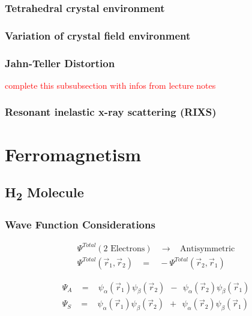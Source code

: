 \documentclass[10pt]{report}
\numberwithin{equation}{chapter}
\begin{document}
\subsubsection{Tetrahedral crystal environment}


\subsubsection{Variation of crystal field environment}


\subsubsection{Jahn-Teller Distortion}

\textcolor{red}{complete this subsubsection with infos from lecture notes}


\subsubsection{Resonant inelastic x-ray scattering (RIXS)}



\section{Ferromagnetism}

\subsection{H\textsubscript{2} Molecule}

\subsubsection{Wave Function Considerations}

\begin{align}
  \Psi^{Total}(\text{2 Electrons})   ~~~~ \rightarrow ~~~~ \text{Antisymmetric}\\
  \Psi^{Total}(\vec{r}_1, \vec{r}_2) ~~~~ = ~~~~ - \Psi^{Total}(\vec{r}_2, \vec{r}_1)
\end{align}


\begin{align}
  \Psi_A ~~~~ = ~~~~ \psi_\alpha(\vec{r}_1) \psi_\beta(\vec{r}_2) ~~ - ~~ \psi_\alpha(\vec{r}_2)\psi_\beta(\vec{r}_1)\\
  \Psi_S ~~~~ = ~~~~ \psi_\alpha(\vec{r}_1) \psi_\beta(\vec{r}_2) ~~ + ~~ \psi_\alpha(\vec{r}_2)\psi_\beta(\vec{r}_1)
\end{align}
\end{document}
